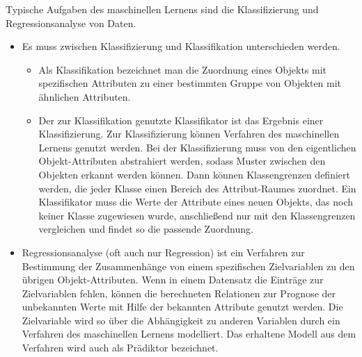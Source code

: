 \documentclass[
	12pt,
	a4paper,
	BCOR10mm,
	DIV14,
	listof=totoc,
	bibliography=totoc,
	headsepline
]{scrreprt}
\begin{document}
Typische Aufgaben des maschinellen Lernens sind die Klassifizierung und Regressionsanalyse von Daten.
\begin{itemize}
\item Es muss zwischen Klassifizierung und Klassifikation unterschieden werden.
\begin{itemize}
\item Als Klassifikation bezeichnet man die Zuordnung eines Objekts mit spezifischen Attributen zu einer bestimmten Gruppe von Objekten mit ähnlichen Attributen.
\item Der zur Klassifikation genutzte Klassifikator ist das Ergebnis einer Klassifizierung.
Zur Klassifizierung können Verfahren des maschinellen Lernens genutzt werden. Bei der Klassifizierung muss von den eigentlichen Objekt-Attributen abstrahiert werden, sodass Muster zwischen den Objekten erkannt werden können. Dann können Klassengrenzen definiert werden, die jeder Klasse einen Bereich des Attribut-Raumes zuordnet. Ein Klassifikator muss die Werte der Attribute eines neuen Objekts, das noch keiner Klasse zugewiesen wurde, anschließend nur mit den Klassengrenzen vergleichen und findet so die passende Zuordnung.
\end{itemize}
\item Regressionsanalyse (oft auch nur Regression) ist ein Verfahren zur Bestimmung der Zusammenhänge von einem spezifischen Zielvariablen zu den übrigen Objekt-Attributen. Wenn in einem Datensatz die Einträge zur Zielvariablen fehlen, können die berechneten Relationen zur Prognose der unbekannten Werte mit Hilfe der bekannten Attribute genutzt werden. Die Zielvariable wird so über die Abhängigkeit zu anderen Variablen durch ein Verfahren des maschinellen Lernens modelliert. Das erhaltene Modell aus dem Verfahren wird auch als Prädiktor bezeichnet. 	
\end{itemize}
\end{document}

